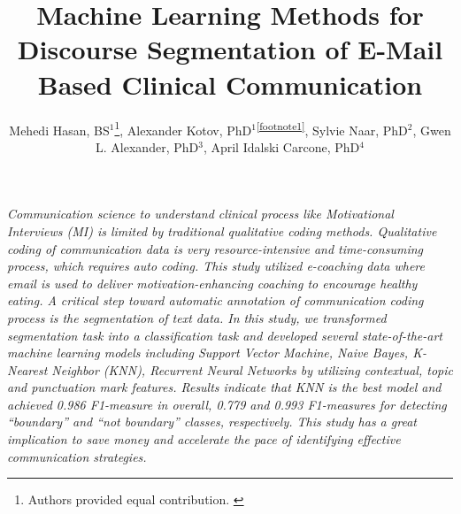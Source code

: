 \documentclass{amia}
\begin{document}
\title{Machine Learning Methods for Discourse Segmentation of E-Mail Based Clinical Communication}

\author{Mehedi Hasan, BS$^{1}$\footnote[1]{Authors provided equal contribution. \label{footnote1}}, Alexander Kotov, PhD$^{1}$\textsuperscript{\ref{footnote1}}, Sylvie Naar, PhD$^{2}$, Gwen L. Alexander, PhD$^{3}$, April Idalski Carcone, PhD$^{4}$}


\maketitle

\textit{Communication science to understand clinical process like Motivational Interviews (MI) is limited by traditional qualitative coding methods. Qualitative coding of communication data is very resource-intensive and time-consuming process, which requires auto coding. This study utilized e-coaching data where email is used to deliver motivation-enhancing coaching to encourage healthy eating. A critical step toward automatic annotation of communication coding process is the segmentation of text data. In this study, we transformed segmentation task into a classification task and developed several state-of-the-art machine learning models including Support Vector Machine, Naive Bayes, K-Nearest Neighbor (KNN), Recurrent Neural Networks by utilizing contextual, topic and punctuation mark features. Results indicate that KNN is the best model and achieved 0.986 F1-measure in overall, 0.779 and 0.993 F1-measures for detecting ``boundary'' and ``not boundary'' classes, respectively. This study has a great implication to save money and accelerate the pace of identifying effective communication strategies.}
\end{document}
